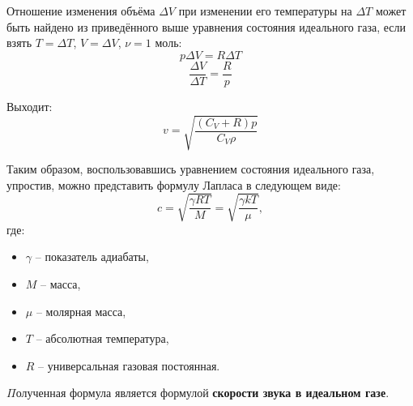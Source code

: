 \documentclass[referat,times]{SCWorks}
\begin{document}
\par Отношение изменения объёма $\Delta V$ при изменении его температуры на $\Delta T$ может быть найдено из приведённого выше уравнения состояния идеального газа, если взять $T = \Delta T$, $V = \Delta V$, $\nu = 1$ моль:
\begin{equation}
    p \Delta V = R \Delta T
\end{equation}
\begin{equation}
    \frac{\Delta V}{\Delta T} = \frac{R}{p}
\end{equation}
\par Выходит:
\begin{equation}
    v = \sqrt{\frac{(C_V + R)p}{C_V \rho}}
\end{equation}
\par Таким образом, воспользовавшись уравнением состояния идеального газа, упростив, можно представить формулу Лапласа в следующем виде:
\begin{equation}
    c = \sqrt{\frac{\gamma R T}M} = \sqrt{\frac{\gamma k T}\mu},
\end{equation}
где:
\begin{itemize}
    \item $\gamma$ -- показатель адиабаты,
    \item $M$ -- масса,
    \item $\mu$ -- молярная масса,
    \item $T$ -- абсолютная температура,
    \item $R$ -- универсальная газовая постоянная.
\end{itemize}
\par $\Pi$олученная формула является формулой \textbf{скорости звука в идеальном газе}.
\end{document}
